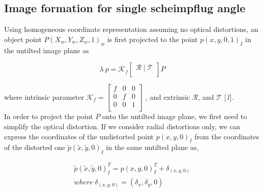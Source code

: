 \documentclass[12pt]{article}
\begin{document}
\subsection{Image formation for single scheimpflug angle}
Using homogeneous coordinate representation assuming no optical distortions, an object point $P (X_{w},Y_{w},Z_{w},1)_w $ is first projected to the point $p (x,y,0,1)_I $ in the untilted image plane as



\begin{equation}  
\lambda~p = \mathcal{K}_f \begin{bmatrix}
\mathcal{R} \mid \mathcal{T}\\
\end{bmatrix}  P
\label{eqn:projm20}
\end{equation}

where intrinsic parameter $\mathcal{K}_f =\begin{bmatrix}
f&0&0\\
0&f&0\\
0&0&1\\
\end{bmatrix}$ , and extrinsic $\mathcal{R}$, and $\mathcal{T}$ [{\it 1}].\\

In order to project the point $P$ onto the untilted image plane, we first need to simplify the optical distortion. If we consider radial distortions only, we can express the coordinates of the undistorted point $p (x,y,0)_I$ from the coordinates of the distorted one $\tilde{p}(\tilde{x},\tilde{y},0)_I$ in the same untilted plane as,

\begin{equation}
\begin{split}
\tilde{p}(\tilde{x},\tilde{y},0)_I^T= p(x,y,0)_I^T + \delta_{(x,y,0)}  \\
where~\delta_{(x,y,0)} =(\delta_x,\delta_y,0)
\label{fig:dist2a}
\end{split}
\end{equation}

\end{document}
